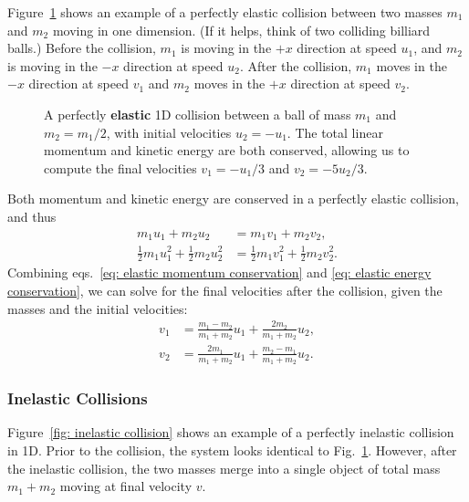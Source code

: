 \documentclass[addpoints]{physlabs}
\begin{document}
\begin{labsection}
\begin{theory}
    Figure~\ref{fig: elastic collision} shows an example of a perfectly elastic collision between two masses $m_1$ and $m_2$ moving in one dimension. (If it helps, think of two colliding billiard balls.) Before the collision, $m_1$ is moving in the $+x$ direction at speed $u_1$, and $m_2$ is moving in the $-x$ direction at speed $u_2$. After the collision, $m_1$ moves in the $-x$ direction at speed $v_1$ and $m_2$ moves in the $+x$ direction at speed $v_2$.

    \begin{figure}[ht]
        \centering
        
        \caption{A perfectly \textbf{elastic} 1D collision between a ball of mass $m_1$ and $m_2=m_1/2$, with initial velocities $u_2=-u_1$. The total linear momentum and kinetic energy are both conserved, allowing us to compute the final velocities $v_1=-u_1/3$ and $v_2=-5u_2/3$.}
        \label{fig: elastic collision}
    \end{figure}

    \noindent
    Both momentum and kinetic energy are conserved in a perfectly elastic collision, and thus
    \begin{align}
        m_1u_1 + m_2u_2 &= m_1v_1 + m_2v_2, \label{eq: elastic momentum conservation}
        \\
        \frac{1}{2}m_1u_1^2 + \frac{1}{2}m_2u_2^2 &= \frac{1}{2}m_1v_1^2 + \frac{1}{2}m_2v_2^2. \label{eq: elastic energy conservation}
    \end{align}
    Combining eqs.~\ref{eq: elastic momentum conservation} and \ref{eq: elastic energy conservation}, we can solve for the final velocities after the collision, given the masses and the initial velocities:
    \begin{align}
        v_1 &= \frac{m_1-m_2}{m_1+m_2}u_1 + \frac{2m_2}{m_1+m_2}u_2, \label{eq: elastic velocity 1}
        \\
        v_2 &= \frac{2m_1}{m_1+m_2}u_1 + \frac{m_2-m_1}{m_1+m_2}u_2. \label{eq: elastic velocity 2}
    \end{align}

    \subsubsection*{Inelastic Collisions}

    Figure~\ref{fig: inelastic collision} shows an example of a perfectly inelastic collision in 1D. Prior to the collision, the system looks identical to Fig.~\ref{fig: elastic collision}. However, after the inelastic collision, the two masses merge into a single object of total mass $m_1+m_2$ moving at final velocity $v$.


\end{theory}
\end{labsection}
\end{document}
